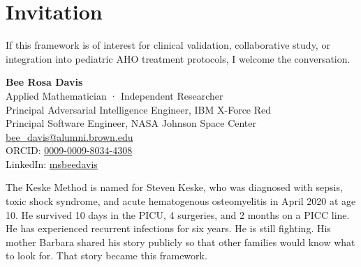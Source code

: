 \documentclass[11pt]{article}
\begin{document}
\section{Invitation}

If this framework is of interest for clinical validation, collaborative study,
or integration into pediatric AHO treatment protocols, I welcome the
conversation.

\medskip
\noindent
\textbf{Bee Rosa Davis}\\
Applied Mathematician · Independent Researcher\\
Principal Adversarial Intelligence Engineer, IBM X-Force Red\\
Principal Software Engineer, NASA Johnson Space Center\\
\href{mailto:bee_davis@alumni.brown.edu}{bee\_davis@alumni.brown.edu}\\
ORCID: \href{https://orcid.org/0009-0009-8034-4308}{0009-0009-8034-4308}\\
LinkedIn: \href{https://www.linkedin.com/in/msbeedavis/}{msbeedavis}

\vspace{10pt}
{\small\color{muted}
The Keske Method is named for Steven Keske, who was diagnosed with sepsis,
toxic shock syndrome, and acute hematogenous osteomyelitis in April 2020 at age 10.
He survived 10 days in the PICU, 4 surgeries, and 2 months on a PICC line.
He has experienced recurrent infections for six years. He is still fighting.
His mother Barbara shared his story publicly so that other families would know
what to look for. That story became this framework.
}
\end{document}
